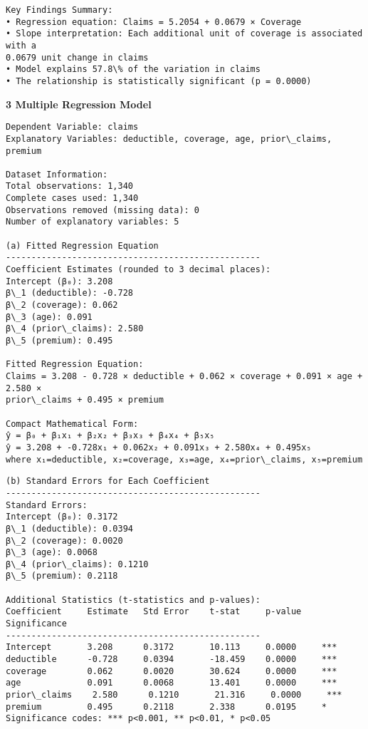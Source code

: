 \documentclass[8pt, twocolumn]{extarticle}
\begin{document}
    \begin{Verbatim}[commandchars=\\\{\}]
Key Findings Summary:
• Regression equation: Claims = 5.2054 + 0.0679 × Coverage
• Slope interpretation: Each additional unit of coverage is associated with a
0.0679 unit change in claims
• Model explains 57.8\% of the variation in claims
• The relationship is statistically significant (p = 0.0000)
    \end{Verbatim}
    \textbf{3 Multiple Regression Model}
    \begin{Verbatim}[commandchars=\\\{\}]
Dependent Variable: claims
Explanatory Variables: deductible, coverage, age, prior\_claims, premium

Dataset Information:
Total observations: 1,340
Complete cases used: 1,340
Observations removed (missing data): 0
Number of explanatory variables: 5

(a) Fitted Regression Equation
--------------------------------------------------
Coefficient Estimates (rounded to 3 decimal places):
Intercept (β₀): 3.208
β\_1 (deductible): -0.728
β\_2 (coverage): 0.062
β\_3 (age): 0.091
β\_4 (prior\_claims): 2.580
β\_5 (premium): 0.495

Fitted Regression Equation:
Claims = 3.208 - 0.728 × deductible + 0.062 × coverage + 0.091 × age + 2.580 ×
prior\_claims + 0.495 × premium

Compact Mathematical Form:
ŷ = β₀ + β₁x₁ + β₂x₂ + β₃x₃ + β₄x₄ + β₅x₅
ŷ = 3.208 + -0.728x₁ + 0.062x₂ + 0.091x₃ + 2.580x₄ + 0.495x₅
where x₁=deductible, x₂=coverage, x₃=age, x₄=prior\_claims, x₅=premium
    \end{Verbatim}
    \begin{Verbatim}[commandchars=\\\{\}]
(b) Standard Errors for Each Coefficient
--------------------------------------------------
Standard Errors:
Intercept (β₀): 0.3172
β\_1 (deductible): 0.0394
β\_2 (coverage): 0.0020
β\_3 (age): 0.0068
β\_4 (prior\_claims): 0.1210
β\_5 (premium): 0.2118

Additional Statistics (t-statistics and p-values):
Coefficient     Estimate   Std Error    t-stat     p-value    Significance
--------------------------------------------------
Intercept       3.208      0.3172       10.113     0.0000     ***
deductible      -0.728     0.0394       -18.459    0.0000     ***
coverage        0.062      0.0020       30.624     0.0000     ***
age             0.091      0.0068       13.401     0.0000     ***
prior\_claims    2.580      0.1210       21.316     0.0000     ***
premium         0.495      0.2118       2.338      0.0195     *
Significance codes: *** p<0.001, ** p<0.01, * p<0.05
    \end{Verbatim}
\end{document}
